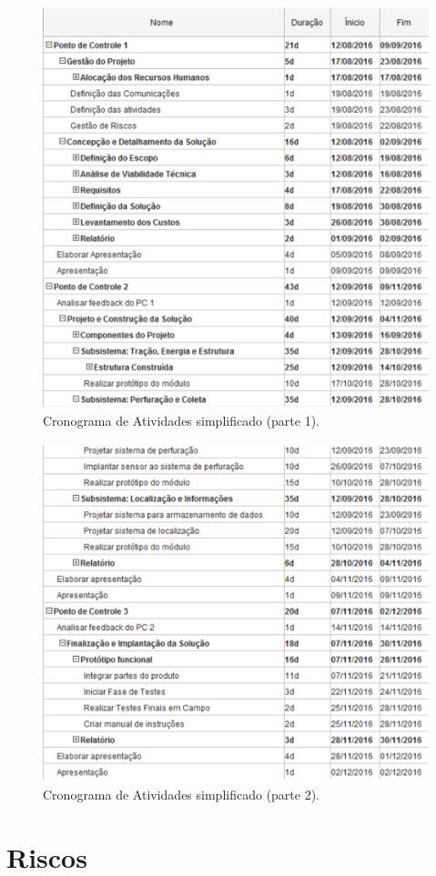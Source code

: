 \begin{figure}[!htbp]
\begin{center}
\includegraphics[width=\textwidth]{figuras/cronograma_simples_1.eps}
\caption{\label{fig:cron_s1}Cronograma de Atividades simplificado (parte 1).}
\end{center}
\end{figure}

\begin{figure}[!htbp]
\begin{center}
\includegraphics[width=\textwidth]{figuras/cronograma_simples_2.eps}
\caption{\label{fig:cron_s2}Cronograma de Atividades simplificado (parte 2).}
\end{center}
\end{figure}

  \section{Riscos}
  
